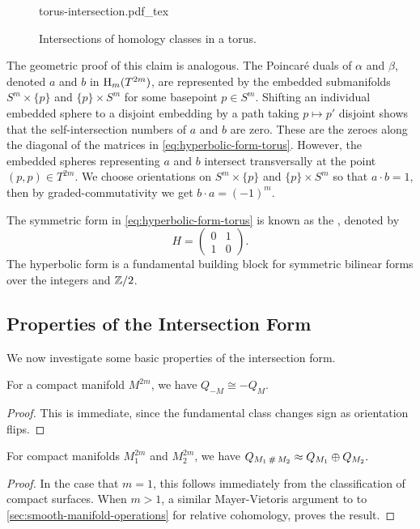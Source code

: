 \begin{figure}[ht]
	\centering
	{torus-intersection.pdf_tex}
	\caption{Intersections of homology classes in a torus.}\label{fig:geometric-intersection-torus}
\end{figure}

The geometric proof of this claim is analogous. The Poincar\'e duals of $\alpha$ and $\beta$, denoted $a$ and $b$ in $\operatorname{H}_{m}(T^{2m})$, are represented
by the embedded submanifolds $S^m\times \{p\}$ and $\{p\}\times S^m$ for some basepoint $p\in S^m$. Shifting an individual embedded sphere to a disjoint embedding by a path taking $p\mapsto p'$ disjoint shows that the self-intersection numbers of $a$ and $b$ are zero. These are the zeroes along the diagonal of the matrices in \cref{eq:hyperbolic-form-torus}. However, the embedded spheres representing $a$ and $b$ intersect transversally at the point $(p,p)\in T^{2m}$. We choose orientations on $S^m\times \{p\}$ and $\{p\}\times S^m$ so that $a\cdot b=1$, then by graded-commutativity we get $b\cdot a=(-1)^m$.

\begin{remark}
	The symmetric form in \cref{eq:hyperbolic-form-torus} is known as the , denoted by
	\[
		H=\begin{pmatrix} 0 & 1\\ 1 & 0 \end{pmatrix}.
	\]
	The hyperbolic form is a fundamental building block for symmetric bilinear forms over the integers and $\mathbb{Z}/2$.
\end{remark}

\subsection{Properties of the Intersection Form}
We now investigate some basic properties of the intersection form.

\begin{proposition}\label{prop:orientation-intersection-form}
	For a compact manifold $M^{2m}$, we have
	$Q_{-M} \cong -Q_{M}$.
\end{proposition}
\begin{proof}
	This is immediate, since the fundamental class changes sign as orientation flips.
\end{proof}

\begin{proposition}\label{prop:connected-sum-intersection-form}
	For compact manifolds $M_1^{2m}$ and $M_2^{2m}$, we have
	$Q_{M_1\+M_2} \cong Q_{M_1}\oplus Q_{M_2}.$
\end{proposition}
\begin{proof}
	In the case that $m=1$, this follows immediately from the classification of compact surfaces. When $m>1$, a similar Mayer-Vietoris argument to
to \cref{sec:smooth-manifold-operations} for relative cohomology, proves the result.
\end{proof}

